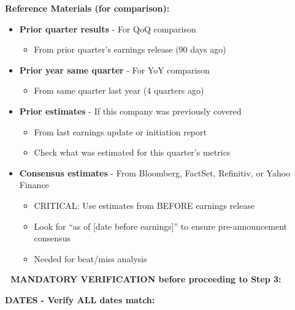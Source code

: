 \documentclass[11pt]{article}
\begin{document}
\textbf{Reference Materials (for comparison):}

\begin{itemize}[leftmargin=*,itemsep=2pt,topsep=2pt]
\item {} \textbf{Prior quarter results} - For QoQ comparison
\begin{itemize}[leftmargin=*,itemsep=2pt,topsep=2pt]
\item {} From prior quarter's earnings release (90 days ago)
\end{itemize}
\item {} \textbf{Prior year same quarter} - For YoY comparison
\begin{itemize}[leftmargin=*,itemsep=2pt,topsep=2pt]
\item {} From same quarter last year (4 quarters ago)
\end{itemize}
\item {} \textbf{Prior estimates} - If this company was previously covered
\begin{itemize}[leftmargin=*,itemsep=2pt,topsep=2pt]
\item {} From last earnings update or initiation report
\item {} Check what was estimated for this quarter's metrics
\end{itemize}
\item {} \textbf{Consensus estimates} - From Bloomberg, FactSet, Refinitiv, or Yahoo Finance
\begin{itemize}[leftmargin=*,itemsep=2pt,topsep=2pt]
\item {} CRITICAL: Use estimates from BEFORE earnings release
\item {} Look for ``as of [date before earnings]'' to ensure pre-announcement consensus
\item {} Needed for beat/miss analysis
\end{itemize}
\end{itemize}

\textbf{🛑 MANDATORY VERIFICATION before proceeding to Step 3:}


\textbf{DATES - Verify ALL dates match:}
\end{document}
